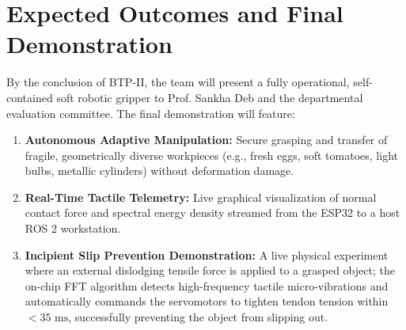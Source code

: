 \documentclass[12pt,a4paper]{report}
\begin{document}
\section{Expected Outcomes and Final Demonstration}
By the conclusion of BTP-II, the team will present a fully operational, self-contained soft robotic gripper to Prof. Sankha Deb and the departmental evaluation committee. The final demonstration will feature:
\begin{enumerate}
    \item \textbf{Autonomous Adaptive Manipulation:} Secure grasping and transfer of fragile, geometrically diverse workpieces (e.g., fresh eggs, soft tomatoes, light bulbs, metallic cylinders) without deformation damage.
    \item \textbf{Real-Time Tactile Telemetry:} Live graphical visualization of normal contact force and spectral energy density streamed from the ESP32 to a host ROS 2 workstation.
    \item \textbf{Incipient Slip Prevention Demonstration:} A live physical experiment where an external dislodging tensile force is applied to a grasped object; the on-chip FFT algorithm detects high-frequency tactile micro-vibrations and automatically commands the servomotors to tighten tendon tension within $<35\text{ ms}$, successfully preventing the object from slipping out.
\end{enumerate}

\newpage


\end{document}

